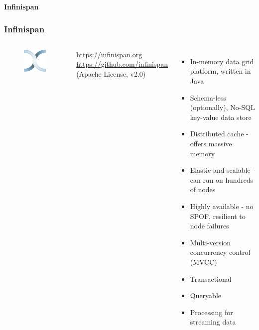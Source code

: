 \documentclass[10pt,utf8]{beamer}
\begin{document}


\begin{frame}
	\centering
	\huge{\textbf{Infinispan}}
\end{frame}

\begin{frame}
	\frametitle{Infinispan}
	\begin{columns}
		\begin{figure}
			\centering
			\includegraphics[width=3cm]{./img/infinispan.eps}
		\end{figure}
		\vspace{0.38cm}
		\color{blue}
			\url{https://infinispan.org}\\
			\vspace{0.1cm}
			\scriptsize{\url{https://github.com/infinispan}}\\
		\color{black}
		\scriptsize{(Apache License, v2.0)}
		\begin{itemize}
			\item In-memory data grid platform, written in Java
			\item Schema-less (optionally), No-SQL key-value data store
			\item Distributed cache - offers massive memory
			\item Elastic and scalable - can run on hundreds of nodes
			\item Highly available - no SPOF, resilient to node failures
			\item Multi-version concurrency control (MVCC)
			\item Transactional
			\item Queryable
			\item Processing for streaming data
		\end{itemize}
	\end{columns}
\end{frame}
\end{document}

